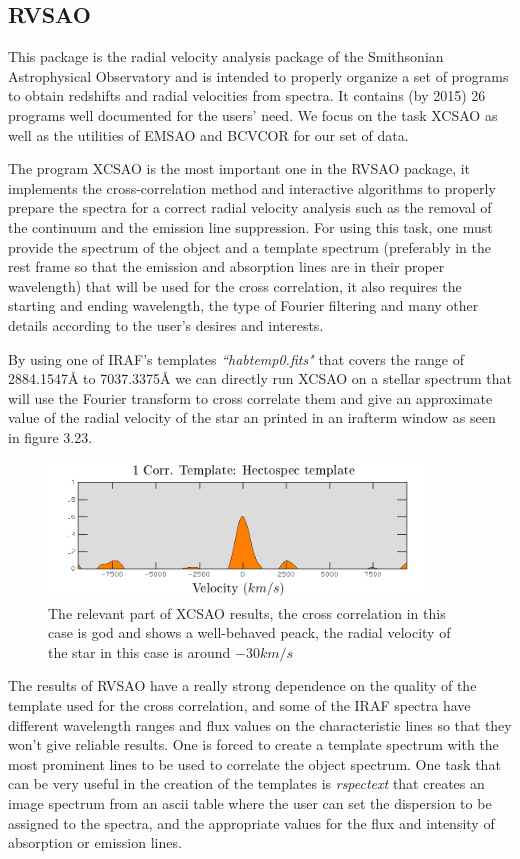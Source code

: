 \subsection{RVSAO}

This package is the radial velocity analysis package of the Smithsonian Astrophysical Observatory and is intended to properly organize a set of programs to obtain redshifts and radial velocities from spectra. It contains (by 2015) 26 programs well documented for the users' need. We focus on the task XCSAO as well as the utilities of EMSAO and BCVCOR for our set of data.

The program XCSAO is the most important one in the RVSAO package, it implements the cross-correlation method and interactive algorithms to properly prepare the spectra for a correct radial velocity analysis such as the removal of the continuum and the emission line suppression. For using this task, one must provide the spectrum of the object and a template spectrum (preferably in the rest frame so that the emission and absorption lines are in their proper wavelength) that will be used for the cross correlation, it also requires the starting and ending wavelength, the type of Fourier filtering and many other details according to the user's desires and interests.

By using one of IRAF's templates \textit{``habtemp0.fits"} that covers the range of 2884.1547$\textrm{\AA}$ to 7037.3375$\textrm{\AA}$ we can directly run XCSAO on a stellar spectrum that will use the Fourier transform to cross correlate them and give an approximate value of the radial velocity of the star an printed in an irafterm window as seen in figure 3.23. 

\begin{figure}[H]
\centering
\includegraphics[width=10cm]{images/xcsao.png}
\caption[XCSAO results]{The relevant part of XCSAO results, the cross correlation in this case is god and shows a well-behaved peack, the radial velocity of the star in this case is around $-30km/s$}
\end{figure}

The results of RVSAO have a really strong dependence on the quality of the template used for the cross correlation, and some of the IRAF spectra have different wavelength ranges and flux values on the characteristic lines so that they won't give reliable results. One is forced to create a template spectrum with the most prominent lines to be used to correlate the object spectrum. One task that can be very useful in the creation of the templates is \textit{rspectext} that creates an image spectrum from an ascii table where the user can set the dispersion to be assigned to the spectra, and the appropriate values for the flux and intensity of absorption or emission lines.

